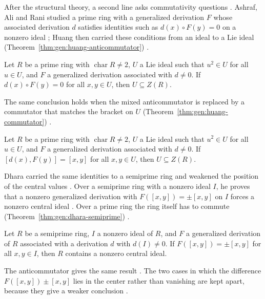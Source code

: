 After the structural theory, a second line asks commutativity questions
\cite[pp.~1--2]{Huang2007}.
Ashraf, Ali and Rani studied a prime ring with a generalized derivation $F$
whose associated derivation $d$ satisfies identities such as
$d(x)\circ F(y)=0$ on a nonzero ideal \cite[p.~1]{Huang2007}; Huang then
carried these conditions from an ideal to a Lie ideal (Theorem~\ref{thm:gen:huang-anticommutator})
\cite[p.~2]{Huang2007}.\begin{theorem}\label{thm:gen:huang-anticommutator}
Let $R$ be a prime ring with $\operatorname{char}R\neq 2$, $U$ a Lie ideal
such that $u^{2}\in U$ for all $u\in U$, and $F$ a generalized derivation
associated with $d\neq 0$. If $d(x)\circ F(y)=0$ for all $x,y\in U$, then
$U\subseteq Z(R)$.
\end{theorem}

The same conclusion holds when the mixed anticommutator is replaced by a
commutator that matches the bracket on $U$
(Theorem~\ref{thm:gen:huang-commutator}) \cite[p.~5]{Huang2007}.

\begin{theorem}\label{thm:gen:huang-commutator}
Let $R$ be a prime ring with $\operatorname{char}R\neq 2$, $U$ a Lie ideal
such that $u^{2}\in U$ for all $u\in U$, and $F$ a generalized derivation
associated with $d\neq 0$. If $[d(x),F(y)]=[x,y]$ for all $x,y\in U$, then
$U\subseteq Z(R)$.
\end{theorem}

Dhara carried the same identities to a semiprime ring and weakened the
position of the central values \cite[p.~1]{Dhara2010Remarks}. Over a semiprime
ring with a nonzero ideal $I$, he proves that a nonzero generalized derivation
with $F([x,y])=\pm[x,y]$ on $I$ forces a nonzero central ideal
\cite[Theorem~2.4, p.~2]{Dhara2010Remarks}. Over a prime ring the ring itself
has to commute (Theorem~\ref{thm:gen:dhara-semiprime}) \cite[Corollary~2.5,
p.~3]{Dhara2010Remarks}.

\begin{theorem}\label{thm:gen:dhara-semiprime}
Let $R$ be a semiprime ring, $I$ a nonzero ideal of $R$, and $F$ a generalized
derivation of $R$ associated with a derivation $d$ with $d(I)\neq 0$. If
$F([x,y])=\pm[x,y]$ for all $x,y\in I$, then $R$ contains a nonzero central ideal.
\end{theorem}

The anticommutator gives the same result \cite[Theorem~2.6,
p.~3]{Dhara2010Remarks}. The two cases in which the difference
$F([x,y])\pm[x,y]$ lies in the center rather than vanishing are kept apart,
because they give a weaker conclusion \cite[Theorem~2.8,
p.~4]{Dhara2010Remarks}.

